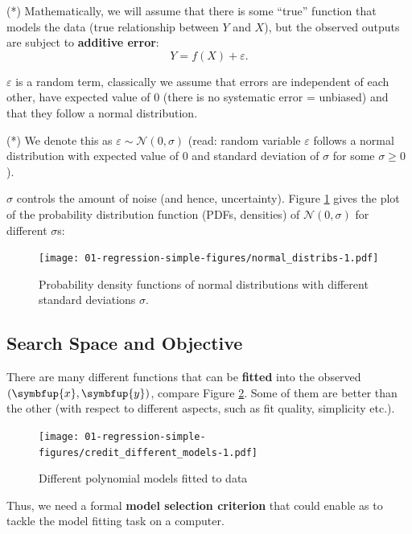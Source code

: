 \documentclass[10pt,b5paper,krantz1]{krantz}
\renewcommand{\mathbf}[1]{\symbfup{#1}}
\begin{document}
(*) Mathematically, we will assume that there is some ``true'' function that models the data
(true relationship between \(Y\) and \(X\)),
but the observed outputs are subject to \textbf{additive error}:
\[Y=f(X)+\varepsilon.\]

\(\varepsilon\) is a random term, classically we assume that
errors are independent of each other,
have expected value of \(0\) (there is no systematic error = unbiased)
and that they follow a normal distribution.

(*) We denote this as \(\varepsilon\sim\mathcal{N}(0, \sigma)\)
(read: random variable \(\varepsilon\) follows a normal distribution
with expected value of \(0\) and standard deviation of \(\sigma\) for some \(\sigma\ge 0\)).

\(\sigma\) controls the amount of noise (and hence, uncertainty).
Figure \ref{fig:normal_distribs} gives the plot of the probability
distribution function (PDFs, densities)
of \(\mathcal{N}(0, \sigma)\) for different \(\sigma\)s:

\begin{figure}
\hypertarget{fig:normal_distribs}{%
\centering
\texttt{[image: 01-regression-simple-figures/normal\_distribs-1.pdf]}
\caption{Probability density functions of normal distributions with different standard deviations \(\sigma\).}\label{fig:normal_distribs}
}
\end{figure}

\hypertarget{search-space-and-objective}{%
\subsection{Search Space and Objective}\label{search-space-and-objective}}

There are many different functions that can be \textbf{fitted} into
the observed \((\mathbf{x},\mathbf{y})\),
compare Figure \ref{fig:credit_different_models}.
Some of them are better than the other (with respect to
different aspects, such as fit quality, simplicity etc.).

\begin{figure}
\hypertarget{fig:credit_different_models}{%
\centering
\texttt{[image: 01-regression-simple-figures/credit\_different\_models-1.pdf]}
\caption{Different polynomial models fitted to data}\label{fig:credit_different_models}
}
\end{figure}

Thus, we need a formal \textbf{model selection criterion}
that could enable as to tackle the model fitting
task on a computer.
\end{document}
